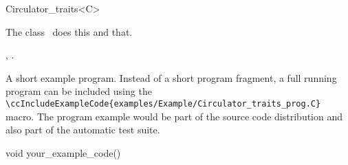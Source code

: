 

\begin{ccRefClass}{Circulator_traits<C>}  %


\ccDefinition
  
The class \ccRefName\ does this and that.


\ccIsModel


\ccTypes


\ccCreation
{}  %


\clearpage
\ccOperations


\ccSeeAlso

,
.

\ccExample

A short example program.
Instead of a short program fragment, a full running program can be
included using the 
\verb|\ccIncludeExampleCode{examples/Example/Circulator_traits_prog.C}| 
macro. The program example would be part of the source code distribution and
also part of the automatic test suite.

\begin{ccExampleCode}
void your_example_code() {
}
\end{ccExampleCode}


\end{ccRefClass}


